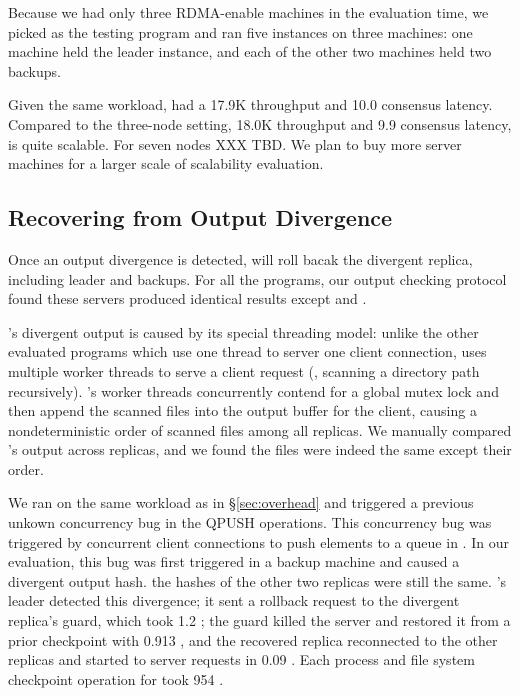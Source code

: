 
Because we had only three RDMA-enable machines in the evaluation time, we 
picked \redis as the testing program and ran five \xxx instances on three 
machines: one machine held the leader instance, and each of the other two 
machines held two backups.

Given the same \redis workload, \xxx had a 17.9K throughput and 10.0 \us 
consensus latency. Compared to the three-node setting, 18.0K throughput and 9.9 
\us consensus latency, \xxx is quite scalable. For seven nodes XXX TBD. We plan 
to buy more server machines for a larger scale of scalability evaluation.





\subsection{Recovering from Output Divergence} \label{sec:robust}

Once an output divergence is detected, \xxx will roll bacak the divergent 
replica, including leader and backups. For all the \nprog programs, our output 
checking protocol found these servers produced identical results except \clamav 
and \ssdb.

\clamav's divergent output is caused by its special threading model: 
unlike the other evaluated programs which use one thread to server one client 
connection, \clamav uses multiple worker threads to serve a client request 
(\eg, scanning a directory path recursively). \xxx's worker threads 
concurrently contend for a global mutex lock and then append the scanned 
files into the output buffer for the client, causing a nondeterministic order 
of scanned files among all replicas. We manually compared \clamav's output 
across replicas, and we found the files were indeed the same except their order.

We ran \ssdb on the same workload as in \S\ref{sec:overhead} and triggered a 
previous unkown concurrency bug in the QPUSH operations. This concurrency bug 
was triggered by concurrent client connections to push elements to a queue in 
\ssdb. In our evaluation, this bug was first triggered in a backup machine and 
caused a divergent output hash. the hashes of the other two replicas were 
still the same. \xxx's leader detected this divergence; it sent a 
rollback request to the divergent replica's guard, which took 1.2 \ms; 
the guard killed the \ssdb server and restored it from a prior 
checkpoint with 0.913 \ms, and the recovered replica reconnected to the other 
replicas and started to server requests in 0.09 \ms. Each process and file 
system checkpoint operation for \ssdb took 954 \ms.

